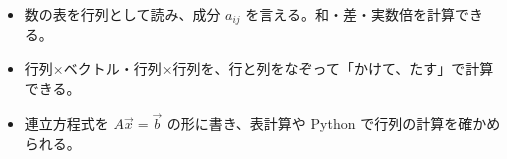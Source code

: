 \newcommand\kviibfx[2]{\tikz[baseline=(f.base)]{\node[draw=bkLine, line width=0.6pt, fill=white, minimum height=5.5mm, inner xsep=2mm, font=\sffamily\footnotesize, minimum width=12mm] (c) {#1};
  \node[anchor=west, draw=bkLine, line width=0.6pt, fill=white, minimum height=5.5mm, inner xsep=2mm, minimum width=50mm, text width=46mm, align=left, font=\ttfamily\footnotesize] (f) at ([xshift=1mm]c.east) {#2};}}
\newcommand\kviibgrid[4]{%
  \draw[bkLine, line width=0.4pt, step=1] (#1,#3) grid (#2,#4);
  \draw[bkInk, line width=0.7pt, -{Stealth[length=2.2mm]}] (#1,0) -- ({#2+0.7},0) node[right, font=\footnotesize, inner sep=1pt] {$x$};
  \draw[bkInk, line width=0.7pt, -{Stealth[length=2.2mm]}] (0,#3) -- (0,{#4+0.7}) node[above, font=\footnotesize, inner sep=1pt] {$y$};
  \node[below left, font=\sffamily\footnotesize, inner sep=1.2pt] at (0,0) {O};}
\newcommand\kviibspring[2]{\draw[bkInk, line width=0.8pt, decorate, decoration={zigzag, amplitude=1.5mm, segment length=2.2mm, pre length=1.5mm, post length=1.5mm}] #1 -- ++(0,-#2);}
\newcommand\kviibc[2]{\node[kviib cell] at #1 {#2};}
\makeatother


\begin{goal}
\begin{itemize}[label={\color{\bkTT}●}, leftmargin=1.6\zw, itemsep=0pt, topsep=1pt]
\item {}\enspace 数の表を行列として読み、成分 $a_{ij}$ を言える。和・差・実数倍を計算できる。
\item {}\enspace 行列×ベクトル・行列×行列を、行と列をなぞって「かけて、たす」で計算できる。
\item {}\enspace 連立方程式を $A\vec x=\vec b$ の形に書き、表計算や Python で行列の計算を確かめられる。
\end{itemize}
\end{goal}

